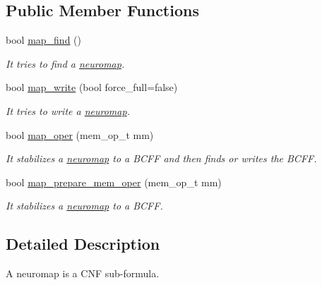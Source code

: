 \subsection*{Public Member Functions}
\begin{DoxyCompactItemize}
\item 
bool \hyperlink{classneuromap_a5da738c0ecb7ba74a4fc435ca33b1fcb}{map\+\_\+find} ()
\begin{DoxyCompactList}\small\item\em It tries to find a \hyperlink{classneuromap}{neuromap}. \end{DoxyCompactList}\item 
bool \hyperlink{classneuromap_adb0c3a4698866c919272f9b4ba5998fd}{map\+\_\+write} (bool force\+\_\+full=false)
\begin{DoxyCompactList}\small\item\em It tries to write a \hyperlink{classneuromap}{neuromap}. \end{DoxyCompactList}\item 
bool \hyperlink{classneuromap_a5ad7c9c245129fc8a162742c11d4e972}{map\+\_\+oper} (mem\+\_\+op\+\_\+t mm)
\begin{DoxyCompactList}\small\item\em It stabilizes a \hyperlink{classneuromap}{neuromap} to a B\+C\+F\+F and then finds or writes the B\+C\+F\+F. \end{DoxyCompactList}\item 
bool \hyperlink{classneuromap_a9c0e877474e2d17cf8b9da564de8b8c3}{map\+\_\+prepare\+\_\+mem\+\_\+oper} (mem\+\_\+op\+\_\+t mm)
\begin{DoxyCompactList}\small\item\em It stabilizes a \hyperlink{classneuromap}{neuromap} to a B\+C\+F\+F. \end{DoxyCompactList}\end{DoxyCompactItemize}


\subsection{Detailed Description}
A neuromap is a C\+N\+F sub-\/formula. 

